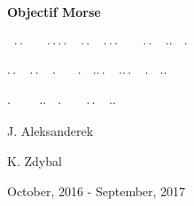 \documentclass[12pt]{report}
\begin{document}
\begin{titlepage}
    \begin{center}

		\vspace*{5cm}    

        \Huge
        \textbf{Objectif Morse}
        
        \vspace*{0.5cm}

		\Large

		\textbf{
		\text{-}\text{-}\text{-} \,			%
		$\cdot\cdot$\text{-} \,\,\,\,\,\,	%
		$\cdot\cdot\cdot\cdot$ \,			%
		$\cdot\cdot$ \,						%
		$\cdot\cdot\cdot$ \,				%
		\text{-} \,							%
		\text{-}\text{-}\text{-} \,			%
		$\cdot\cdot$ \,						%
		$\cdot$\text{-}$\cdot$ \,			%
		$\cdot$}							%
		
		\textbf{
		\text{-}$\cdot\cdot$ \,				%
		$\cdot\cdot$\text{-} \,				%
		\text{-}$\cdot$ \,\,\,\,\,\,		%
		$\cdot$\text{-} \,					%
		$\cdot$\text{-}$\cdot\cdot$ \, 		%
		$\cdot$\text{-}$\cdot\cdot$ \, 		%
		$\cdot$ \,							%
		$\cdot$\text{-}$\cdot$}				%
		
		\textbf{
		$\cdot$ \,							%
		\text{-} \,\,\,\,\,\,				%
		$\cdot$\text{-}$\cdot$	\,			%
		$\cdot$ \,							%
		\text{-} \,							%
		\text{-}\text{-}\text{-} \,			%
		$\cdot\cdot$\text{-} \,				%
		$\cdot$\text{-}$\cdot$}				%
		

        \vspace{2cm}
        
        \LARGE
        J. Aleksanderek
        
        K. Zdybal

        \vspace{8.5cm}
        
		\Large

 		October, 2016 - September, 2017
	\end{center}
\end{titlepage}
\end{document}
